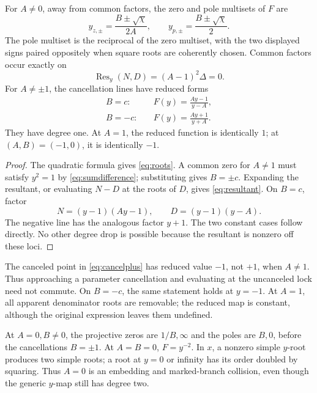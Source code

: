 \begin{proposition}\label{prop:divisors}
For \(A\ne0\), away from common factors, the zero and pole multisets of \(F\) are
\begin{equation}\label{eq:roots}
y_{z,\pm}=\frac{B\pm\sqrt\chi}{2A},\qquad
y_{p,\pm}=\frac{B\pm\sqrt\chi}{2}.
\end{equation}
The pole multiset is the reciprocal of the zero multiset, with the two displayed signs paired oppositely when square roots are coherently chosen. Common factors occur exactly on
\begin{equation}\label{eq:resultant}
\operatorname{Res}_y(N,D)=(A-1)^2\Delta=0.
\end{equation}
For \(A\ne\pm1\), the cancellation lines have reduced forms
\begin{align}
B=c:&\quad F(y)=\frac{Ay-1}{y-A},\label{eq:cancelplus}\\
B=-c:&\quad F(y)=\frac{Ay+1}{y+A}.\label{eq:cancelminus}
\end{align}
They have degree one. At \(A=1\), the reduced function is identically \(1\); at \((A,B)=(-1,0)\), it is identically \(-1\).
\end{proposition}
\begin{proof}
The quadratic formula gives \eqref{eq:roots}. A common zero for \(A\ne1\) must satisfy \(y^2=1\) by \eqref{eq:sumdifference}; substituting gives \(B=\pm c\). Expanding the resultant, or evaluating \(N-D\) at the roots of \(D\), gives \eqref{eq:resultant}. On \(B=c\), factor
\[
N=(y-1)(Ay-1),\qquad D=(y-1)(y-A).
\]
The negative line has the analogous factor \(y+1\). The two constant cases follow directly. No other degree drop is possible because the resultant is nonzero off these loci.
\end{proof}

The canceled point in \eqref{eq:cancelplus} has reduced value \(-1\), not \(+1\), when \(A\ne1\). Thus approaching a parameter cancellation and evaluating at the uncanceled lock need not commute. On \(B=-c\), the same statement holds at \(y=-1\). At \(A=1\), all apparent denominator roots are removable; the reduced map is constant, although the original expression leaves them undefined.

At \(A=0,B\ne0\), the projective zeros are \(1/B,\infty\) and the poles are \(B,0\), before the cancellations \(B=\pm1\). At \(A=B=0\), \(F=y^{-2}\). In \(x\), a nonzero simple \(y\)-root produces two simple roots; a root at \(y=0\) or infinity has its order doubled by squaring. Thus \(A=0\) is an embedding and marked-branch collision, even though the generic \(y\)-map still has degree two.

